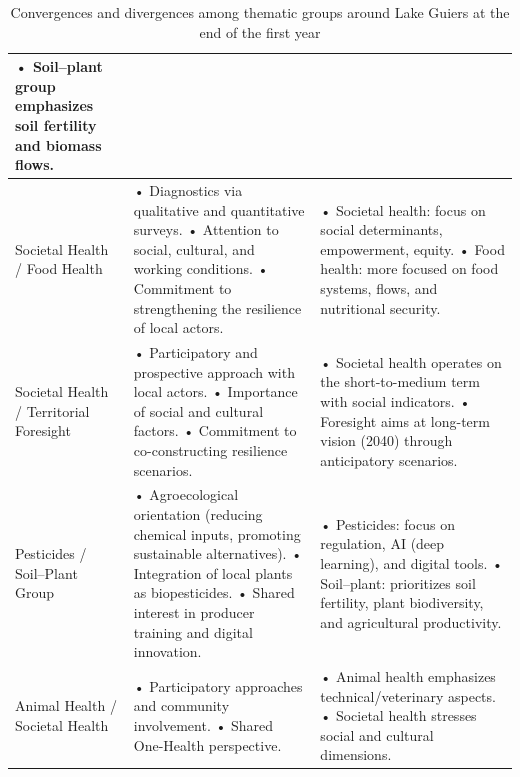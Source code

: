 \documentclass{article}
\begin{document}
\begin{table}[h!]
\begin{tabularx}{\textwidth}{>{\raggedright\arraybackslash}p{3.2cm} X X}
• Soil–plant group emphasizes soil fertility and biomass flows. \\
\hline
Societal Health / Food Health
& • Diagnostics via qualitative and quantitative surveys. \newline
• Attention to social, cultural, and working conditions. \newline
• Commitment to strengthening the resilience of local actors.
& • Societal health: focus on social determinants, empowerment, equity. \newline
• Food health: more focused on food systems, flows, and nutritional security. \\
\hline
Societal Health / Territorial Foresight
& • Participatory and prospective approach with local actors. \newline
• Importance of social and cultural factors. \newline
• Commitment to co-constructing resilience scenarios.
& • Societal health operates on the short-to-medium term with social indicators. \newline
• Foresight aims at long-term vision (2040) through anticipatory scenarios. \\
\hline
Pesticides / Soil–Plant Group
& • Agroecological orientation (reducing chemical inputs, promoting sustainable alternatives). \newline
• Integration of local plants as biopesticides. \newline
• Shared interest in producer training and digital innovation.
& • Pesticides: focus on regulation, AI (deep learning), and digital tools. \newline
• Soil–plant: prioritizes soil fertility, plant biodiversity, and agricultural productivity. \\
\hline
Animal Health / Societal Health
& • Participatory approaches and community involvement. \newline
• Shared One-Health perspective.
& • Animal health emphasizes technical/veterinary aspects. \newline
• Societal health stresses social and cultural dimensions. \\
\hline
\end{tabularx}
\caption{Convergences and divergences among thematic groups around Lake Guiers at the end of the first year}\label{tab:resultcs1}
\end{table}
\end{document}
